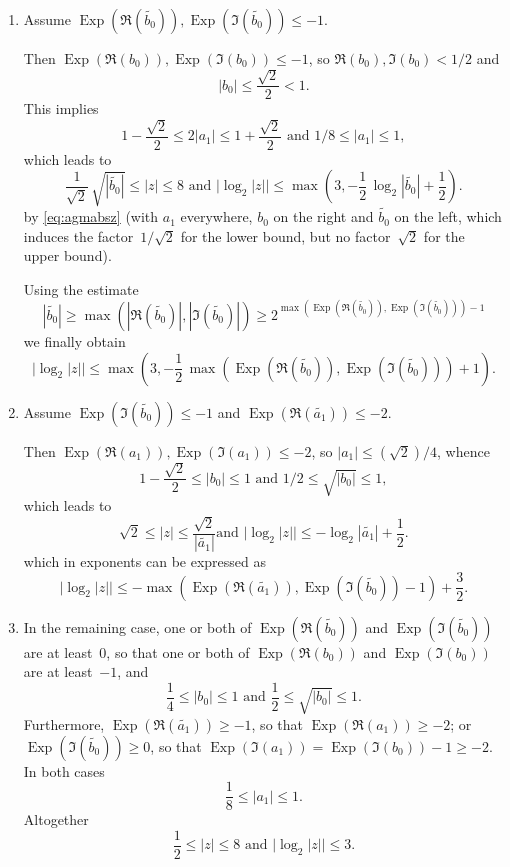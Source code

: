 \documentclass [11pt]{article}
\newcommand {\appro}[1]{\widetilde {#1}}
\DeclareMathOperator{\Exp}{\operatorname {Exp}}
\renewcommand {\leq}{\leqslant}
\renewcommand {\geq}{\geqslant}
\begin{document}
\begin {enumerate}
\item
Assume $\Exp (\Re (\appro {b_0})), \Exp (\Im (\appro {b_0})) \leq -1$.

Then $\Exp (\Re (b_0)), \Exp (\Im (b_0)) \leq -1$, so
$\Re (b_0), \Im (b_0) < 1/2$ and
\[
|b_0| \leq \frac {\sqrt 2}{2} < 1.
\]
This implies
\[
1 - \frac {\sqrt 2}{2} \leq 2 |a_1| \leq 1 + \frac {\sqrt 2}{2}
\text { and }
1/8 \leq |a_1| \leq 1,
\]
which leads to
\[
\frac {1}{\sqrt 2} \, \sqrt {\left| \appro {b_0} \right|} \leq |z| \leq 8
\text { and }
\big| \log_2 |z| \big| \leq
\max \left(
3, - \frac {1}{2} \, \log_2 \left| \appro {b_0} \right| + \frac {1}{2}
\right).
\]
by \eqref {eq:agmabsz}
(with $a_1$ everywhere, $b_0$ on the right and $\appro {b_0}$ on the left,
which induces the factor~$1/\sqrt 2$ for the lower bound, but no
factor~$\sqrt 2$ for the upper bound).

Using the estimate
\[
\left| \appro {b_0} \right|
\geq \max \left( |\Re (\appro {b_0})|, |\Im (\appro {b_0})| \right)
\geq
2^{\max \left( \Exp (\Re (\appro {b_0})), \Exp (\Im (\appro {b_0})) \right)
- 1}
\]
we finally obtain
\begin {equation}
\label {eq:agmlb}
\big| \log_2 |z| \big| \leq
\max \left(
3, - \frac {1}{2} \,
\max \left( \Exp (\Re (\appro {b_0})), \Exp (\Im (\appro {b_0})) \right) + 1
\right).
\end {equation}

\item
Assume $\Exp (\Im (\appro {b_0})) \leq -1$ and
$\Exp (\Re (\appro {a_1})) \leq -2$.

Then $\Exp (\Re (a_1)), \Exp (\Im (a_1)) \leq -2$, so
$|a_1| \leq (\sqrt 2) / 4$,
whence
\[
1 - \frac {\sqrt 2}{2} \leq |b_0| \leq 1
\text { and }
1/2 \leq \sqrt {|b_0|} \leq 1,
\]
which leads to
\[
\sqrt 2 \leq |z| \leq \frac {\sqrt 2}{|\appro {a_1}|}
\text {and }
\big| \log_2 |z| \big| \leq
- \log_2 \left| \appro {a_1} \right| + \frac {1}{2}.
\]
which in exponents can be expressed as
\begin {equation}
\label {eq:agmla}
\big| \log_2 |z| \big| \leq
- \max \left( \Exp (\Re (\appro {a_1})), \Exp (\Im (\appro {b_0})) - 1 \right)
+ \frac {3}{2}.
\end {equation}

\item
In the remaining case, one or both of
$\Exp (\Re (\appro {b_0}))$ and $\Exp (\Im (\appro {b_0}))$
are at least~$0$, so that one or both of
$\Exp (\Re (b_0))$ and $\Exp (\Im (b_0))$
are at least~$-1$, and
\[
\frac {1}{4} \leq |b_0| \leq 1 \text { and }
\frac {1}{2} \leq \sqrt {|b_0|} \leq 1.
\]
Furthermore,
$\Exp (\Re (\appro {a_1})) \geq -1$, so that
$\Exp (\Re (a_1)) \geq -2$;
or $\Exp (\Im (\appro {b_0})) \geq 0$, so that
$\Exp (\Im (a_1)) = \Exp (\Im (b_0)) - 1 \geq -2$.
In both cases
\[
\frac {1}{8} \leq |a_1| \leq 1.
\]
Altogether
\begin {equation}
\label {eq:agml}
\frac {1}{2} \leq |z| \leq 8
\text { and }
\big| \log_2 |z| \big| \leq 3.
\end {equation}
\end {enumerate}
\end{document}
